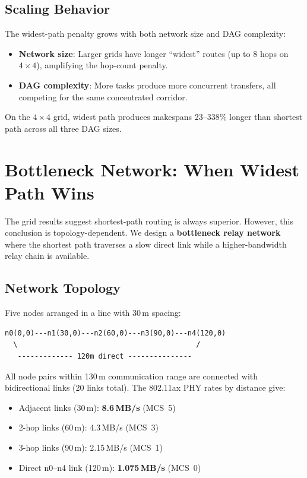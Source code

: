 \documentclass[11pt]{article}
\begin{document}
\subsection{Scaling Behavior}

The widest-path penalty grows with both network size and DAG complexity:

\begin{itemize}
    \item \textbf{Network size}: Larger grids have longer ``widest'' routes
    (up to 8 hops on $4\times4$), amplifying the hop-count penalty.
    \item \textbf{DAG complexity}: More tasks produce more concurrent transfers,
    all competing for the same concentrated corridor.
\end{itemize}

On the $4\times4$ grid, widest path produces makespans 23--338\% longer than
shortest path across all three DAG sizes.

\clearpage
\section{Bottleneck Network: When Widest Path Wins}

The grid results suggest shortest-path routing is always superior. However,
this conclusion is topology-dependent. We design a \textbf{bottleneck relay
network} where the shortest path traverses a slow direct link while a
higher-bandwidth relay chain is available.

\subsection{Network Topology}

Five nodes arranged in a line with 30\,m spacing:

\begin{verbatim}
n0(0,0)---n1(30,0)---n2(60,0)---n3(90,0)---n4(120,0)
  \                                          /
   ------------- 120m direct ---------------
\end{verbatim}

All node pairs within 130\,m communication range are connected with
bidirectional links (20 links total). The 802.11ax PHY rates by distance give:

\begin{itemize}
    \item Adjacent links (30\,m): \textbf{8.6\,MB/s} (MCS~5)
    \item 2-hop links (60\,m): 4.3\,MB/s (MCS~3)
    \item 3-hop links (90\,m): 2.15\,MB/s (MCS~1)
    \item Direct n0--n4 link (120\,m): \textbf{1.075\,MB/s} (MCS~0)
\end{itemize}
\end{document}

